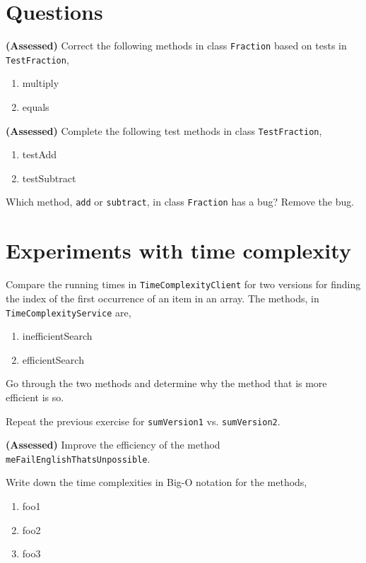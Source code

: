 \section*{Questions}
\begin{questions}

\question \textbf{(Assessed)}
Correct the following methods in class \texttt{Fraction} based on tests in \texttt{TestFraction},

\begin{enumerate}
	\item multiply
	\item equals
\end{enumerate}

\question \textbf{(Assessed)}
Complete the following test methods in class \texttt{TestFraction},

\begin{enumerate}
	\item testAdd
	\item testSubtract
\end{enumerate}

Which method, \texttt{add} or \texttt{subtract}, in class \texttt{Fraction} has a bug? Remove the bug.

\section*{Experiments with time complexity}

\question 
Compare the running times in \texttt{TimeComplexityClient} for two versions for finding the index of the first occurrence of an item in an array. The methods, in \texttt{TimeComplexityService} are,

\begin{enumerate}
\item inefficientSearch
\item efficientSearch	
\end{enumerate}

Go through the two methods and determine why the method that is more efficient is so.

\question
Repeat the previous exercise for \texttt{sumVersion1} vs. \texttt{sumVersion2}.

\question \textbf{(Assessed)}
Improve the efficiency of the method \texttt{meFailEnglishThatsUnpossible}.

\question
Write down the time complexities in Big-O notation for the methods,

\begin{enumerate}
	\item foo1
	\item foo2
	\item foo3
\end{enumerate}

\end{questions}

